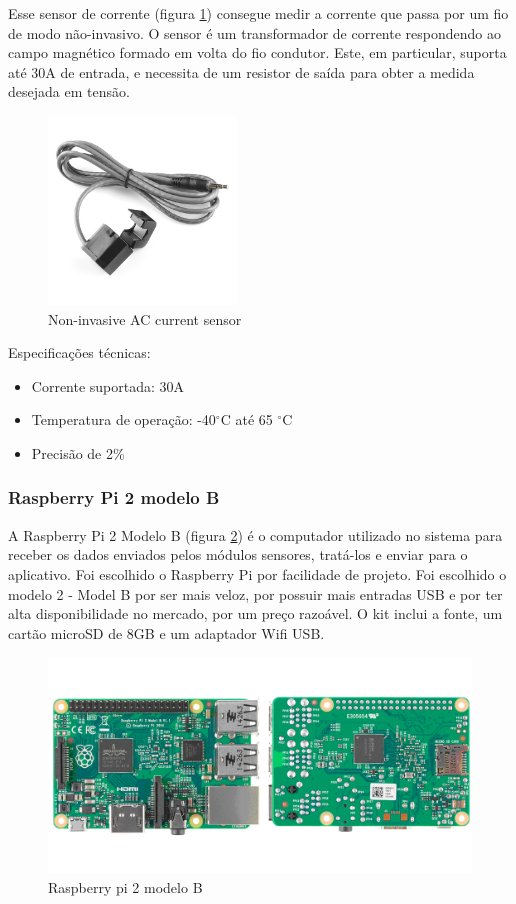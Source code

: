 Esse sensor de corrente (figura \ref{fig:sensor}) consegue medir a corrente que passa por um fio de modo não-invasivo. O sensor é um transformador de corrente respondendo ao campo magnético formado em volta do fio condutor. Este, em particular, suporta até 30A de entrada, e necessita de um resistor de saída para obter a medida desejada em tensão.

\begin{figure}[H]
\begin{center}
\includegraphics[width=5cm,height=5cm,keepaspectratio]{figuras/sensor.jpg}
\caption{\label{fig:sensor} Non-invasive AC current sensor}
\end{center}
\end{figure}

Especificações técnicas:
\begin{itemize}
\item{Corrente suportada: 30A}
\item{Temperatura de operação: -40$^{\circ}$C até 65 $^{\circ}$C}
\item{Precisão de 2\%}
\end{itemize}
%
\subsubsection{Raspberry Pi 2 modelo B}

A Raspberry Pi 2 Modelo B (figura \ref{fig:raspberry pi}) é o computador utilizado no sistema para receber os dados enviados pelos módulos sensores, tratá-los e enviar para o aplicativo. Foi escolhido o Raspberry Pi por facilidade de projeto. Foi escolhido o modelo 2 - Model B por ser mais veloz, por possuir mais entradas USB e por ter alta disponibilidade no mercado, por um preço razoável. O kit inclui a fonte, um cartão microSD de 8GB e um adaptador Wifi USB.

\begin{figure}[H]
\includegraphics[width=1\textwidth]{figuras/raspberry_pi.png}
\caption{\label{fig:raspberry pi} Raspberry pi 2 modelo B}
\end{figure}

